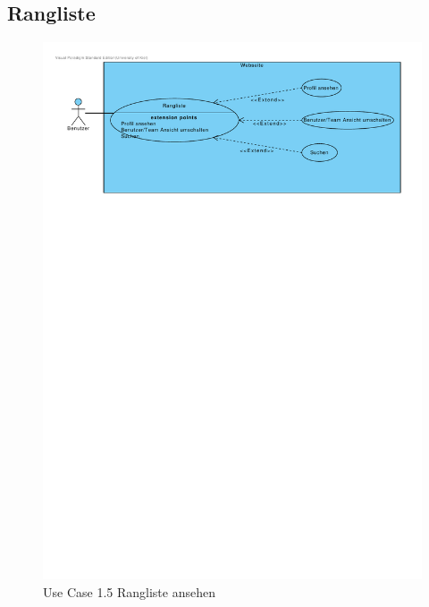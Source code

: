 \documentclass[10pt,a4paper]{article}
\begin{document}
\subsection{Rangliste}
	\begin{figure}[h!]
		\includegraphics[width=\linewidth]{gfx/webseite/rangliste.pdf}
                \caption{Use Case 1.5 Rangliste ansehen}
        \end{figure}
\end{document}
